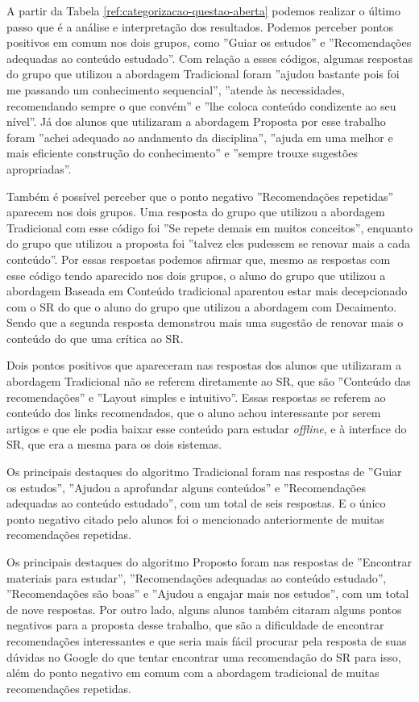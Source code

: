 A partir da Tabela \ref{ref:categorizacao-questao-aberta} podemos realizar o último passo que é a análise e interpretação
dos resultados. Podemos perceber pontos positivos em comum nos dois grupos, como ''Guiar os estudos'' e ''Recomendações adequadas ao conteúdo estudado''.
Com relação a esses códigos, algumas respostas do grupo que utilizou a abordagem Tradicional foram ''ajudou bastante pois foi me passando um conhecimento sequencial'',
''atende às necessidades, recomendando sempre o que convém'' e ''lhe coloca conteúdo condizente ao seu nível''.
Já dos alunos que utilizaram a abordagem Proposta por esse trabalho foram ''achei adequado ao andamento da disciplina'',
''ajuda em uma melhor e mais eficiente construção do conhecimento'' e ''sempre trouxe sugestões apropriadas''.

Também é possível perceber que o ponto negativo ''Recomendações repetidas'' aparecem nos dois grupos. Uma resposta do grupo
que utilizou a abordagem Tradicional com esse código foi ''Se repete demais em muitos conceitos'', enquanto do grupo que utilizou
a proposta foi ''talvez eles pudessem se renovar mais a cada conteúdo''. Por essas respostas podemos afirmar que, mesmo
as respostas com esse código tendo aparecido nos dois grupos, o aluno do grupo que utilizou a abordagem Baseada em Conteúdo
tradicional aparentou estar mais decepcionado com o SR do que o aluno do grupo que utilizou a abordagem com Decaimento.
Sendo que a segunda resposta demonstrou mais uma sugestão de renovar mais o conteúdo do que uma crítica ao SR.

Dois pontos positivos que apareceram nas respostas dos alunos que utilizaram a abordagem Tradicional não se referem diretamente
ao SR, que são ''Conteúdo das recomendações'' e ''Layout simples e intuitivo''. Essas respostas se referem ao conteúdo
dos links recomendados, que o aluno achou interessante por serem artigos e que ele podia baixar esse conteúdo para estudar
\textit{offline}, e à interface do SR, que era a mesma para os dois sistemas.

Os principais destaques do algoritmo Tradicional foram nas respostas de ''Guiar os estudos'',
''Ajudou a aprofundar alguns conteúdos'' e ''Recomendações adequadas ao conteúdo estudado'',
com um total de seis respostas. E o único ponto negativo citado pelo alunos foi o mencionado anteriormente de muitas recomendações
repetidas.

Os principais destaques do algoritmo Proposto foram nas respostas de ''Encontrar materiais para estudar'',
''Recomendações adequadas ao conteúdo estudado'', ''Recomendações são boas'' e ''Ajudou a engajar mais nos estudos'',
com um total de nove respostas. Por outro lado, alguns alunos também citaram alguns pontos negativos para a proposta desse
trabalho, que são a dificuldade de encontrar recomendações interessantes e que seria mais fácil procurar pela resposta de
suas dúvidas no Google do que tentar encontrar uma recomendação do SR para isso, além do ponto negativo em comum com a abordagem
tradicional de muitas recomendações repetidas.

